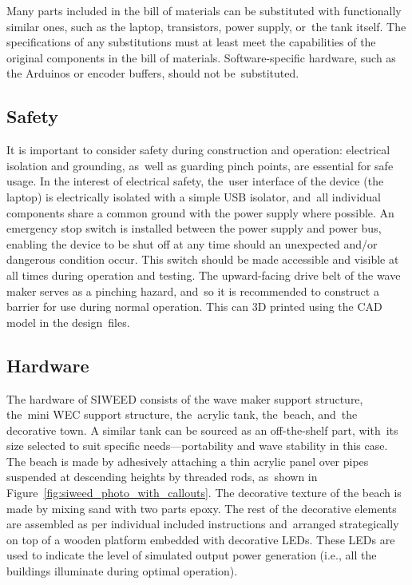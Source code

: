 \documentclass[hardware,article,submit,pdftex,moreauthors]{Definitions/mdpi}
\begin{document}
Many parts included in the bill of materials can be substituted with functionally similar ones, such as the laptop, transistors, power supply, or~the tank itself.
The specifications of any substitutions must at least meet the capabilities of the original components in the bill of materials.
Software-specific hardware, such as the Arduinos or encoder buffers, should not be~substituted. 

\subsection{Safety}
It is important to consider safety during construction and operation: electrical isolation and grounding, as~well as guarding pinch points, are essential for safe usage.
In the interest of electrical safety, the~user interface of the device (the laptop) is electrically isolated with a simple USB isolator, and~all individual components share a common ground with the power supply where possible.
An emergency stop switch is installed between the power supply and power bus, enabling the device to be shut off at any time should an unexpected and/or dangerous condition occur.
This switch should be made accessible and visible at all times during operation and testing.
The upward-facing drive belt of the wave maker serves as a pinching hazard, and~so it is recommended to construct a barrier for use during normal operation.
This can 3D printed using the CAD model in the design~files.


\subsection{Hardware}
The hardware of SIWEED consists of the wave maker support structure, the~mini WEC support structure, the~acrylic tank, the~beach, and~the decorative town. 
A similar tank can be sourced as an off-the-shelf part, with~its size selected to suit specific needs---portability and wave stability in this case. 
The beach is made by adhesively attaching a thin acrylic panel over pipes suspended at descending heights by threaded rods, as~shown in Figure~\ref{fig:siweed_photo_with_callouts}.
The decorative texture of the beach is made by mixing sand with two parts epoxy.
The rest of the decorative elements are assembled as per individual included instructions and~arranged strategically on top of a wooden platform embedded with decorative LEDs. 
These LEDs are used to indicate the level of simulated output power generation (i.e., all the buildings illuminate during optimal operation).
\end{document}
